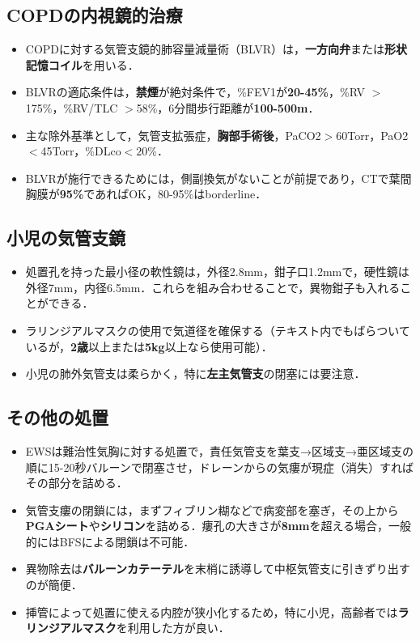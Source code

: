 \subsection{COPDの内視鏡的治療}
\begin{itemize}

\item COPDに対する気管支鏡的肺容量減量術（BLVR）は，\textbf{一方向弁}または\textbf{形状記憶コイル}を用いる．
\item BLVRの適応条件は，\textbf{禁煙}が絶対条件で，\%FEV1が\textbf{20-45\%}，\%RV $>$175\%，\%RV/TLC $>$58\%，6分間歩行距離が\textbf{100-500m}．
\item 主な除外基準として，気管支拡張症，\textbf{胸部手術後}，PaCO2$>$60Torr，PaO2$<$45Torr，\%DLco$<20$\%．
\item BLVRが施行できるためには，側副換気がないことが前提であり，CTで葉間胸膜が\textbf{95\%}であればOK，80-95\%はborderline．
\end{itemize}

\subsection{小児の気管支鏡}
\begin{itemize}
\item 処置孔を持った最小径の軟性鏡は，外径2.8mm，鉗子口1.2mmで，硬性鏡は外径7mm，内径6.5mm．これらを組み合わせることで，異物鉗子も入れることができる．
\item ラリンジアルマスクの使用で気道径を確保する（テキスト内でもばらついているが，\textbf{2歳}以上または\textbf{5kg}以上なら使用可能）．
\item 小児の肺外気管支は柔らかく，特に\textbf{左主気管支}の閉塞には要注意．
\end{itemize}

\subsection{その他の処置}
\begin{itemize}
\item EWSは難治性気胸に対する処置で，責任気管支を葉支→区域支→亜区域支の順に15-20秒バルーンで閉塞させ，ドレーンからの気瘻が現症（消失）すればその部分を詰める．
\item 気管支瘻の閉鎖には，まずフィブリン糊などで病変部を塞ぎ，その上から\textbf{PGAシート}や\textbf{シリコン}を詰める．瘻孔の大きさが\textbf{8mm}を超える場合，一般的にはBFSによる閉鎖は不可能．
\item 異物除去は\textbf{バルーンカテーテル}を末梢に誘導して中枢気管支に引きずり出すのが簡便．
\item 挿管によって処置に使える内腔が狭小化するため，特に小児，高齢者では\textbf{ラリンジアルマスク}を利用した方が良い．


\end{itemize}



